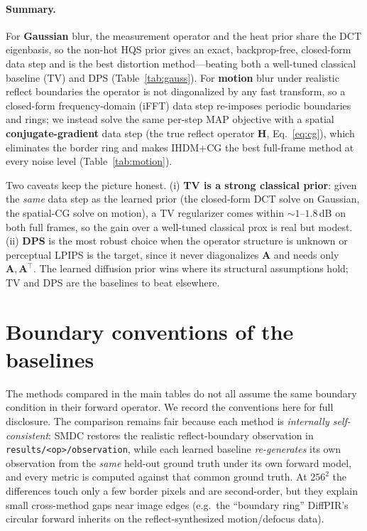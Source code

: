 \documentclass[11pt]{article}
\newcommand{\A}{\mathbf{A}}
\begin{document}
\paragraph{Summary.}
For \textbf{Gaussian} blur, the measurement operator and the heat prior share the DCT
eigenbasis, so the non-hot HQS prior gives an exact, backprop-free, closed-form data step and is
the best distortion method---beating both a well-tuned classical baseline (TV) and DPS
(Table~\ref{tab:gauss}). For \textbf{motion} blur under realistic reflect boundaries the operator
is not diagonalized by any fast transform, so a closed-form frequency-domain (iFFT) data step
re-imposes periodic boundaries and rings; we instead solve the same per-step MAP objective with a
spatial \textbf{conjugate-gradient} data step (the true reflect operator $\mathbf H$,
Eq.~\ref{eq:cg}), which eliminates the border ring and makes IHDM$+$CG the best full-frame method
at every noise level (Table~\ref{tab:motion}).

Two caveats keep the picture honest. (i) \textbf{TV is a strong classical prior}: given the
\emph{same} data step as the learned prior (the closed-form DCT solve on Gaussian, the spatial-CG
solve on motion), a TV regularizer comes within $\sim\!1$--$1.8$\,dB on both full frames, so the gain
over a well-tuned classical prox is real but modest. (ii) \textbf{DPS} is the most robust choice when
the operator structure is unknown or perceptual LPIPS is the target, since it never diagonalizes
$\A$ and needs only $\A,\A^\top$. The learned diffusion prior wins where its structural assumptions
hold; TV and DPS are the baselines to beat elsewhere.

\appendix
\section{Boundary conventions of the baselines}
\label{app:boundary}

The methods compared in the main tables do not all assume the same boundary condition in their
forward operator. We record the conventions here for full disclosure. The comparison remains fair
because each method is \emph{internally self-consistent}: SMDC restores the realistic
reflect-boundary observation in \texttt{results/<op>/observation}, while each learned baseline
\emph{re-generates} its own observation from the \emph{same} held-out ground truth under its own
forward model, and every metric is computed against that common ground truth. At $256^2$ the
differences touch only a few border pixels and are second-order, but they explain small cross-method
gaps near image edges (e.g.\ the ``boundary ring'' DiffPIR's circular forward inherits on the reflect-synthesized
motion/defocus data).
\end{document}
